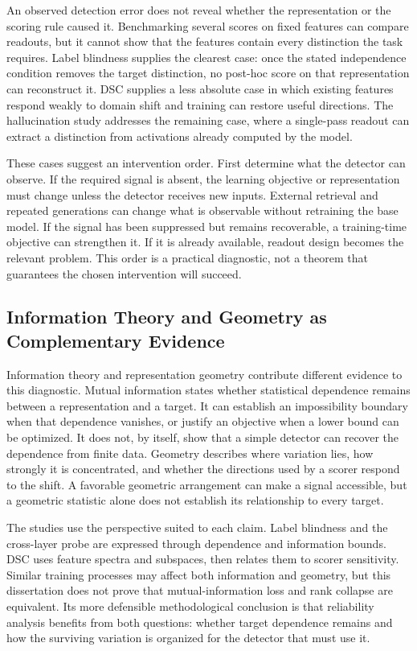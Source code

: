 An observed detection error does not reveal whether the representation or the
scoring rule caused it. Benchmarking several scores on fixed features can compare
readouts, but it cannot show that the features contain every distinction the task
requires. Label blindness supplies the clearest case: once the stated independence
condition removes the target distinction, no post-hoc score on that representation
can reconstruct it. DSC supplies a less absolute case in which existing features
respond weakly to domain shift and training can restore useful directions. The
hallucination study addresses the remaining case, where a single-pass readout can
extract a distinction from activations already computed by the model.

These cases suggest an intervention order. First determine what the detector can
observe. If the required signal is absent, the learning objective or representation
must change unless the detector receives new inputs. External retrieval and repeated
generations can change what is observable without retraining the base model. If the
signal has been suppressed but remains recoverable, a
training-time objective can strengthen it. If it is already available, readout
design becomes the relevant problem. This order is a practical diagnostic, not a
theorem that guarantees the chosen intervention will succeed.

\subsection{Information Theory and Geometry as Complementary Evidence}
\label{subsec:concl:lenses}

Information theory and representation geometry contribute different evidence to
this diagnostic. Mutual information states whether statistical dependence remains
between a representation and a target. It can establish an impossibility boundary
when that dependence vanishes, or justify an objective when a lower bound can be
optimized. It does not, by itself, show that a simple detector can recover the
dependence from finite data. Geometry describes where variation lies, how strongly
it is concentrated, and whether the directions used by a scorer respond to the
shift. A favorable geometric arrangement can make a signal accessible, but a
geometric statistic alone does not establish its relationship to every target.

The studies use the perspective suited to each claim. Label blindness and the
cross-layer probe are expressed through dependence and information bounds. DSC uses
feature spectra and subspaces, then relates them to scorer sensitivity. Similar training
processes may affect both information and geometry, but this dissertation does not
prove that mutual-information loss and rank collapse are equivalent. Its more
defensible methodological conclusion is that reliability analysis benefits from
both questions: whether target dependence remains and how the surviving variation
is organized for the detector that must use it.

